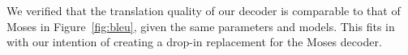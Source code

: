 \documentclass[]{article}
\begin{document}
% 
We verified that the translation quality of our decoder is comparable to that of Moses in Figure~\ref{fig:bleu}, given the same parameters and models. This fits in with our intention of creating a drop-in replacement for the Moses decoder. 
\end{document}

